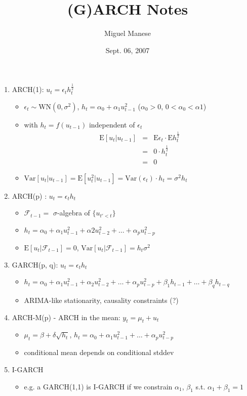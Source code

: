 \documentclass{article}
\title{(G)ARCH Notes}
\author{Miguel Manese}
\date{Sept. 06, 2007}
\newcommand{\E}{\mathrm{E}}
\newcommand{\Var}{\mathrm{Var}}
\begin{document}
\maketitle

\begin{enumerate}
\item ARCH(1): $u_{t} = \epsilon_{t}h_{t}^{\frac{1}{2}}$
    \begin{itemize}
    \item $\epsilon_{t} \sim \mathrm{WN}(0, \sigma^{2})$, 
    $h_{t} = \alpha_{0} + \alpha_{1} u_{t-1}^{2}$ ($\alpha_{0} > 0$,
    $0 < \alpha_{0} < \alpha{1}$) 
    \item with $h_{t} = f(u_{t-1})$ independent of $\epsilon_{t}$
    \begin{eqnarray}
\E[u_{t}|u_{t-1}] & = & \E\epsilon_{t} \cdot \E h_{t}^{\frac{1}{2}} \nonumber \\
                 & = & 0 \cdot h_{t}^{\frac{1}{2}} \nonumber \\
                 & = & 0 \nonumber
    \end{eqnarray}
    \item $\Var[u_{t}|u_{t-1}] = \E[u_{t}^2|u_{t-1}] = 
    \Var(\epsilon_{t}) \cdot h_{t} = \sigma^{2} h_{t}$
    \end{itemize}
\item ARCH(p) : $u_{t} = \epsilon_{t} h_{t}$
    \begin{itemize}
    \item $\mathcal{F}_{t-1} = $ $\sigma$-algebra of $\{u_{t' < t}\}$
    \item $h_{t} = \alpha_{0} + \alpha_{1} u_{t-1}^{2} + \alpha{2} u_{t-2}^{2}
      + \ldots + \alpha_{p} u_{t-p}^{2}$
    \item $\E[u_{t}|\mathcal{F}_{t-1}] = 0$, 
      $\Var[u_{t}|\mathcal{F}_{t-1}] = h_{t}\sigma^{2}$
    \end{itemize}
\item GARCH(p, q): $u_{t} = \epsilon_{t} h_{t}$
    \begin{itemize}
    \item $h_{t} = \alpha_{0} + \alpha_{1} u_{t-1}^2 + \alpha_{2} u_{t-2}^{2}
      + \ldots + \alpha_{p} u_{t-p}^{2} + \beta_{1} h_{t-1} + \ldots 
      + \beta_{q} h_{t-q}$
    \item ARIMA-like stationarity, causality constraints (?)
    \end{itemize}
\item ARCH-M(p) - ARCH in the mean: $y_{t} = \mu_{t} + u_{t}$
    \begin{itemize}
    \item $\mu_{t} = \beta + \delta \sqrt{h_{t}}$, 
        $h_{t} = \alpha_{0} + \alpha_{1}u_{t-1}^{2} + \ldots +
        \alpha_{p} u_{t-p}^{2}$
    \item conditional mean depends on conditional stddev
    \end{itemize}
\item I-GARCH
    \begin{itemize}
    \item e.g. a GARCH(1,1) is I-GARCH if we constrain $\alpha_{1}$,
    $\beta_{1}$ s.t. \mbox{$\alpha_{1} + \beta_{1} = 1$}
    \end{itemize}
\end{enumerate}
\end{document}

